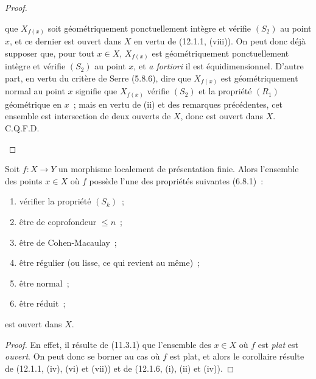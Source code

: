 \begin{proof}
\begin{enumerate}[label=(\roman*)]
  que $X_{f(x)}$ soit géométriquement ponctuellement intègre et vérifie $(S_2)$
  au point $x$, et ce dernier est ouvert dans $X$ en vertu de (12.1.1,
  (viii)). On peut donc déjà supposer que, pour tout $x\in X$, $X_{f(x)}$ est
  géométriquement ponctuellement intègre et vérifie $(S_2)$ au point $x$, et
  \emph{a fortiori} il est équidimensionnel. D'autre part, en vertu du critère
  de Serre (5.8.6), dire que $X_{f(x)}$ est géométriquement normal au point $x$
  signifie que $X_{f(x)}$ vérifie $(S_2)$ et la propriété $(R_1)$ géométrique
  en $x$~;
  mais en vertu de (ii) et des remarques précédentes, cet ensemble est
  intersection de deux ouverts de $X$, donc est ouvert dans $X$. C.Q.F.D.
\end{enumerate}
\end{proof}

\begin{corollary}[12.1.7]
\label{IV.12.1.7-fr}
Soit $f:X\to Y$ un morphisme localement de présentation finie. Alors
l'ensemble des points $x\in X$ où $f$ possède l'une des propriétés suivantes
\textup{(6.8.1)}~:
\begin{enumerate}[label=\textup{(\roman*)}]
  \item vérifier la propriété $(S_k)$~;
  \item être de coprofondeur $\leq n$~;
  \item être de Cohen-Macaulay~;
  \item être régulier \textup{(ou} lisse\textup{, ce qui revient au même)}~;
  \item être normal~;
  \item être réduit~;
\end{enumerate}
est ouvert dans $X$.
\end{corollary}

\begin{proof}
En effet, il résulte de (11.3.1) que l'ensemble des $x\in X$ où $f$ est \emph{plat}
est \emph{ouvert}. On peut donc se borner au cas où $f$ est plat, et alors le
corollaire résulte de (12.1.1, (iv), (vi) et (vii)) et de (12.1.6, (i), (ii)
et (iv)).
\end{proof}

